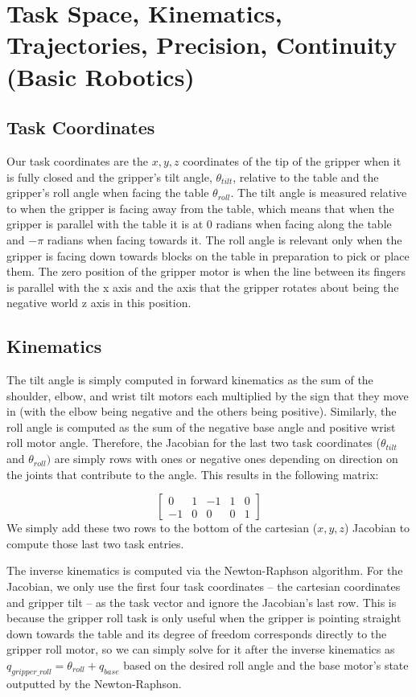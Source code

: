 \section{Task Space, Kinematics, Trajectories, Precision, Continuity (Basic Robotics)}

\subsection{Task Coordinates}
Our task coordinates are the $x, y, z$ coordinates of the tip of the gripper when it is fully closed and the gripper's tilt angle,  $\theta_{tilt}$, relative to the table and the gripper's roll angle when facing the table $\theta_{roll}$. The tilt angle is measured relative to when the gripper is facing away from the table, which means that when the gripper is parallel with the table it is at 0 radians when facing along the table and $-\pi$ radians when facing towards it. The roll angle is relevant only when the gripper is facing down towards blocks on the table in preparation to pick or place them. The zero position of the gripper motor is when the line between its fingers is parallel with the x axis and the axis that the gripper rotates about being the negative world z axis in this position.

\subsection{Kinematics}
The tilt angle is simply computed in forward kinematics as the sum of the shoulder, elbow, and wrist tilt motors each multiplied by the sign that they move in (with the elbow being negative and the others being positive). Similarly, the roll angle is computed as the sum of the negative base angle and positive wrist roll motor angle. Therefore, the Jacobian for the last two task coordinates ($\theta_{tilt}$ and $\theta_{roll})$ are simply rows with ones or negative ones depending on direction on the joints that contribute to the angle. This results in the following matrix:

$$\begin{bmatrix}
0 & 1 & -1 & 1 & 0 \\
-1 & 0 & 0 & 0 & 1
\end{bmatrix}$$
\noindent We simply add these two rows to the bottom of the cartesian ($x,y,z$) Jacobian to compute those last two task entries.

\noindent The inverse kinematics is computed via the Newton-Raphson algorithm. For the Jacobian, we only use the first four task coordinates -- the cartesian coordinates and gripper tilt -- as the task vector and ignore the Jacobian's last row. This is because the gripper roll task is only useful when the gripper is pointing straight down towards the table and its degree of freedom corresponds directly to the gripper roll motor, so we can simply solve for it after the inverse kinematics as $q_{gripper\_roll} = \theta_{roll} + q_{base}$ based on the desired roll angle and the base motor's state outputted by the Newton-Raphson.

